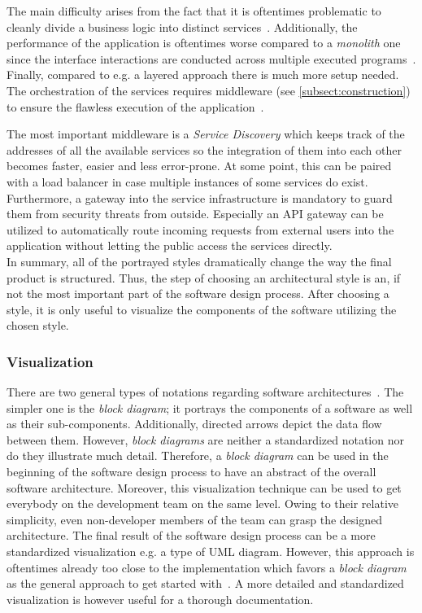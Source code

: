 \documentclass[12pt,a4paper]{report}
\begin{document}
The main difficulty arises from the fact that it is oftentimes problematic to cleanly
divide a business logic into distinct services~\cite{fowler-monolith-first}.
Additionally, the performance of the application is oftentimes worse compared to
a \textit{monolith} one since the interface interactions are conducted across multiple
executed programs~\cite{richards-sa-patterns}.
Finally, compared to e.g. a layered approach there is much more setup needed.
The orchestration of the services requires middleware (see \ref{subsect:construction})
to ensure the flawless execution of the application~\cn.

The most important middleware is a \textit{Service Discovery} which keeps track
of the addresses of all the available services so the integration of them into
each other becomes faster, easier and less error-prone.
At some point, this can be paired with a load balancer in case
multiple instances of some services do exist.
Furthermore, a gateway into the service infrastructure is mandatory to guard
them from security threats from outside. Especially an API gateway can be
utilized to automatically route incoming requests from external users into the
application without letting the public access the services directly.\\

In summary, all of the portrayed styles dramatically change the way the final product
is structured. Thus, the step of choosing an architectural style is an, if not the
most important part of the software design process. After choosing a style,
it is only useful to visualize the components of the software utilizing the chosen style.


\subsubsection{Visualization}

There are two general types of notations regarding software architectures~\cite{sommerville-se}.
The simpler one is the \textit{block diagram}; it portrays the components of
a software as well as their sub-components. Additionally, directed arrows depict
the data flow between them. However, \textit{block diagrams} are neither a
standardized notation nor do they illustrate much detail.
Therefore, a \textit{block diagram} can be used in the beginning of the software
design process to have an abstract of the overall software architecture.
Moreover, this visualization technique can be used to get everybody on the development team
on the same level. Owing to their relative simplicity, even non-developer members
of the team can grasp the designed architecture. The final result of
the software design process can be a more standardized visualization
e.g. a type of UML diagram. However, this approach is oftentimes already too close
to the implementation which favors a \textit{block diagram} as the general
approach to get started with~\cite{sommerville-se}. A more detailed and standardized
visualization is however useful for a thorough documentation.
\end{document}
